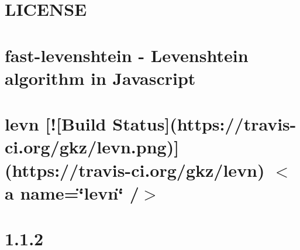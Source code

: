 \documentclass[twoside]{book}
\newcommand{\+}{\discretionary{\mbox{\scriptsize$\hookleftarrow$}}{}{}}
\begin{document}
\chapter{L\+I\+C\+E\+N\+S\+E}
\label{md__c_1__users_martin__documents__git_hub_visual_studio__bachelor__wis_r__wis_r_node_modules_ist21b8c046b11d87dc598fc38cf7b7edb4}
\hypertarget{md__c_1__users_martin__documents__git_hub_visual_studio__bachelor__wis_r__wis_r_node_modules_ist21b8c046b11d87dc598fc38cf7b7edb4}{}

\chapter{fast-\/levenshtein -\/ Levenshtein algorithm in Javascript}
\label{md__c_1__users_martin__documents__git_hub_visual_studio__bachelor__wis_r__wis_r_node_modules_ist88e1d0e3c71a8ff75159ce33238a4d2a}
\hypertarget{md__c_1__users_martin__documents__git_hub_visual_studio__bachelor__wis_r__wis_r_node_modules_ist88e1d0e3c71a8ff75159ce33238a4d2a}{}

\chapter{levn \mbox{[}!\mbox{[}Build Status\mbox{]}(https\+://travis-\/ci.org/gkz/levn.png)\mbox{]}(https\+://travis-\/ci.org/gkz/levn) $<$a name=\char`\"{}levn\char`\"{} /$>$}
\label{md__c_1__users_martin__documents__git_hub_visual_studio__bachelor__wis_r__wis_r_node_modules_ist2eac9bdfa71a36977ef47ce4aef183c0}
\hypertarget{md__c_1__users_martin__documents__git_hub_visual_studio__bachelor__wis_r__wis_r_node_modules_ist2eac9bdfa71a36977ef47ce4aef183c0}{}

\chapter{1.1.2}
\label{md__c_1__users_martin__documents__git_hub_visual_studio__bachelor__wis_r__wis_r_node_modules_ist4150fdefec37b98c4c275267f526924b}
\hypertarget{md__c_1__users_martin__documents__git_hub_visual_studio__bachelor__wis_r__wis_r_node_modules_ist4150fdefec37b98c4c275267f526924b}{}

\end{document}
